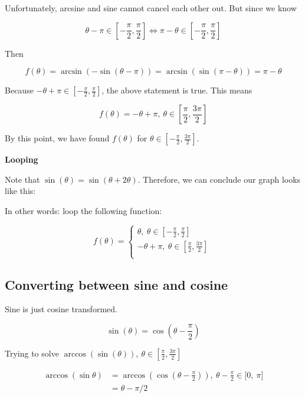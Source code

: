 \documentclass[
]{article}
\begin{document}
Unfortunately, arcsine and sine cannot cancel each other out. But since
we know

$$\theta - \pi \in \left\lbrack - \frac{\pi}{2},\frac{\pi}{2} \right\rbrack \Leftrightarrow \pi - \theta \in \left\lbrack - \frac{\pi}{2},\frac{\pi}{2} \right\rbrack$$

Then

$$f(\theta) = \arcsin\left( - \sin(\theta - \pi) \right) = \arcsin\left( \sin(\pi - \theta) \right) = \pi - \theta$$

Because
$- \theta + \pi \in \left\lbrack - \frac{\pi}{2},\frac{\pi}{2} \right\rbrack$,
the above statement is true. This means

$$f(\theta) = - \theta + \pi,\ \theta \in \left\lbrack \frac{\pi}{2},\frac{3\pi}{2} \right\rbrack$$

By this point, we have found $f(\theta)$ for
$\theta \in \left\lbrack - \frac{\pi}{2},\frac{3\pi}{2} \right\rbrack$.

\textbf{Looping}

Note that $\sin(\theta) = \sin(\theta + 2\theta)$. Therefore, we can
conclude our graph looks like this:

In other words: loop the following function:

$$f(\theta) = \left\{ \begin{matrix}
\theta,\ \theta \in \left\lbrack - \frac{\pi}{2},\frac{\pi}{2} \right\rbrack \\
 - \theta + \pi,\ \theta \in \left\lbrack \frac{\pi}{2},\frac{3\pi}{2} \right\rbrack \\
\end{matrix} \right.\ $$


\subsection{Converting between sine and
cosine}

Sine is just cosine transformed.

$$\sin(\theta) = \cos\left( \theta - \frac{\pi}{2} \right)$$

Trying to solve
$\arccos\left( \sin(\theta) \right),\ \theta \in \left\lbrack \frac{\pi}{2},\frac{3\pi}{2} \right\rbrack$

\begin{align*}
\arccos\left( \sin\theta \right) &= \arccos\left( \cos\left( \theta - \frac{\pi}{2} \right) \right),\ \theta - \frac{\pi}{2} \in \lbrack 0,\ \pi\rbrack
 \\
&= \theta - \pi/2
\end{align*}
\end{document}

